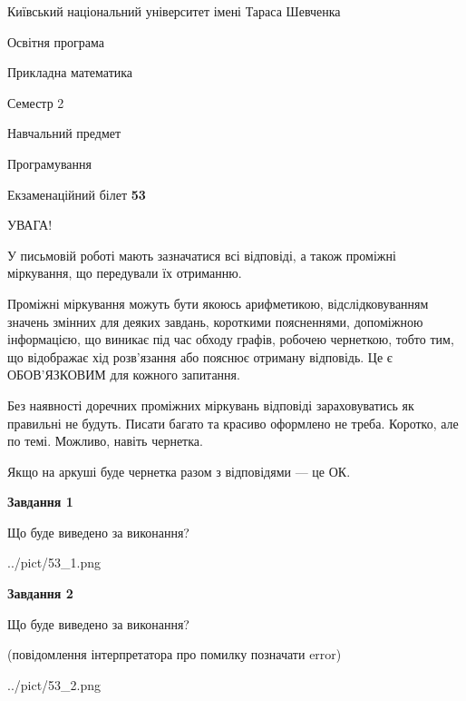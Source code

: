 \documentclass[12pt, ukrainian]{article}
\begin{document}
{{\begin {small}\par
{ \center  Київський національний університет імені Тараса Шевченка \par}
{\parbox {5 cm}{Освітня програма \hfill}{\parbox {7 cm}{Прикладна математика\hfill}}\parbox {6 cm}{\hfill Семестр 2}}\par
{\parbox {5 cm} {Навчальний предмет \hfill}\parbox {7 cm}{Програмування \hfill}\parbox {6cm}{\hfill}\par}\vspace{-7pt} \end{small}}{\center Екзаменаційний білет \No \textbf
{ 53 }\par}}
{
\begin {large}
УВАГА!

У письмовій роботі мають зазначатися всі відповіді, а також проміжні міркування, що передували їх отриманню.

Проміжні міркування можуть бути якоюсь арифметикою, відслідковуванням зна\-чень змінних для деяких завдань,
короткими поясненнями, допоміжною інформацією, що виникає під час обходу графів, робочею чернеткою,
тобто тим, що відображає хід розв’язання або пояснює отриману відповідь.
Це є ОБОВ’ЯЗКОВИМ для кожного запитання.

Без наявності доречних проміжних міркувань відповіді зараховуватись як правиль\-ні не будуть.
Писати багато та красиво оформлено не треба. Коротко, але по темі. Можли\-во, навіть чернетка.

Якщо на аркуші буде чернетка разом з відповідями --- це ОК.

\newpage

{\begin {center}\textbf{Завдання 1}\end {center}}\par
Що буде виведено за виконання?\par
\begin{center}
	{../pict/53_1.png}
\end{center}
\newpage

{\begin {center}\textbf{Завдання 2}\end {center}}\par
Що буде виведено за виконання?\par
 (повідомлення інтерпретатора про помилку позначати error)\par
\begin{center}
	{../pict/53_2.png}
\end{center}
\newpage


\end{large}}
\end{document}
